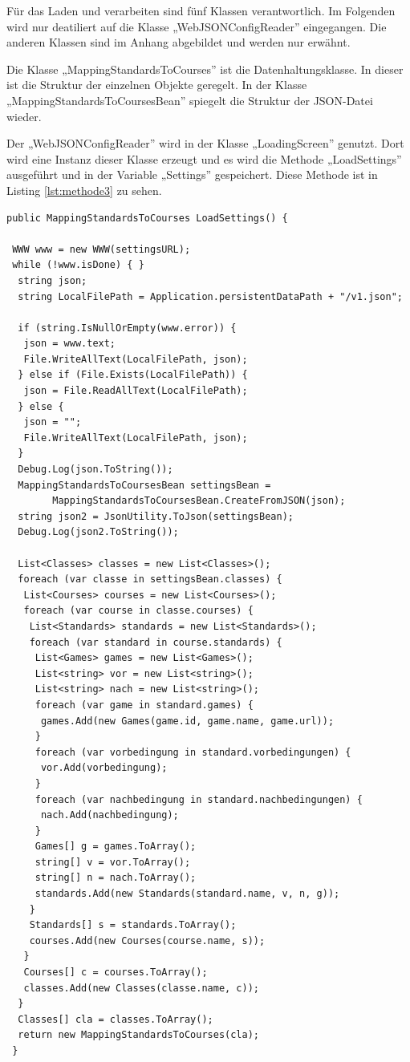 	Für das Laden und verarbeiten sind fünf Klassen verantwortlich. Im Folgenden wird nur deatiliert auf die Klasse „WebJSONConfigReader” eingegangen. Die anderen Klassen sind im Anhang abgebildet und werden nur erwähnt.
	
	Die Klasse „MappingStandardsToCourses” ist die Datenhaltungsklasse. In dieser ist die Struktur der einzelnen Objekte geregelt. In der Klasse „MappingStandardsToCoursesBean” spiegelt die Struktur der \ac{JSON}-Datei wieder. 
	
	Der „WebJSONConfigReader” wird in der Klasse „LoadingScreen” genutzt. Dort wird eine Instanz dieser Klasse erzeugt und es wird die Methode „LoadSettings” ausgeführt und in der Variable „Settings” gespeichert. Diese Methode ist in Listing \ref{lst:methode3} zu sehen.

\begin{scriptsize}
\lstset{
	float,
	caption=Methode LoadSettings, 
	language=[Sharp]C, 
	frame=single,  
	showstringspaces=false, 
	showspaces=false, 
	numbers=left, 
	captionpos=b, 
	belowcaptionskip=4pt,
	basicstyle=\ttfamily
} 
\begin{lstlisting}[label=lst:methode3]
public MappingStandardsToCourses LoadSettings() {

 WWW www = new WWW(settingsURL);
 while (!www.isDone) { }
  string json;
  string LocalFilePath = Application.persistentDataPath + "/v1.json";

  if (string.IsNullOrEmpty(www.error)) {
   json = www.text;
   File.WriteAllText(LocalFilePath, json);
  } else if (File.Exists(LocalFilePath)) {
   json = File.ReadAllText(LocalFilePath);
  } else {
   json = "";                
   File.WriteAllText(LocalFilePath, json);
  }
  Debug.Log(json.ToString());
  MappingStandardsToCoursesBean settingsBean = 
  		MappingStandardsToCoursesBean.CreateFromJSON(json);
  string json2 = JsonUtility.ToJson(settingsBean);
  Debug.Log(json2.ToString());

  List<Classes> classes = new List<Classes>();
  foreach (var classe in settingsBean.classes) {
   List<Courses> courses = new List<Courses>();
   foreach (var course in classe.courses) {
    List<Standards> standards = new List<Standards>();
    foreach (var standard in course.standards) {
     List<Games> games = new List<Games>();
     List<string> vor = new List<string>();
     List<string> nach = new List<string>();
     foreach (var game in standard.games) {
      games.Add(new Games(game.id, game.name, game.url));
     }
     foreach (var vorbedingung in standard.vorbedingungen) {
      vor.Add(vorbedingung);
     }
     foreach (var nachbedingung in standard.nachbedingungen) {
      nach.Add(nachbedingung);
     }
     Games[] g = games.ToArray();
     string[] v = vor.ToArray();
     string[] n = nach.ToArray();
     standards.Add(new Standards(standard.name, v, n, g));
    }
    Standards[] s = standards.ToArray();
    courses.Add(new Courses(course.name, s));
   }
   Courses[] c = courses.ToArray();
   classes.Add(new Classes(classe.name, c));
  }
  Classes[] cla = classes.ToArray();
  return new MappingStandardsToCourses(cla);
 }
\end{lstlisting}
\end{scriptsize}

